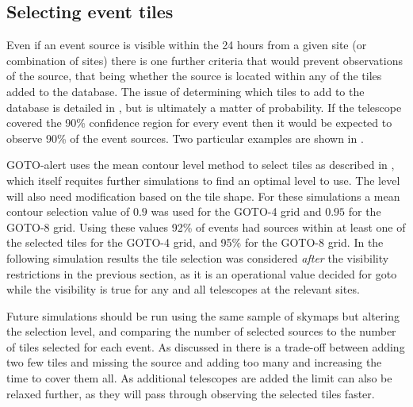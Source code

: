\begin{colsection}
\begin{colsection}
\clearpage

\end{colsection}


\subsection{Selecting event tiles}
\label{sec:gw_selecting}
\begin{colsection}


Even if an event source is visible within the 24 hours from a given site (or combination of sites) there is one further criteria that would prevent observations of the source, that being whether the source is located within any of the tiles added to the database. The issue of determining which tiles to add to the database is detailed in , but is ultimately a matter of probability. If the telescope covered the 90\% confidence region for every event then it would be expected to observe 90\% of the event sources. Two particular examples are shown in .

GOTO-alert uses the mean contour level method to select tiles as described in , which itself requites further simulations to find an optimal level to use. The level will also need modification based on the tile shape. For these simulations a mean contour selection value of $0.9$ was used for the GOTO-4 grid and $0.95$ for the GOTO-8 grid. Using these values 92\% of events had sources within at least one of the selected tiles for the GOTO-4 grid, and 95\% for the GOTO-8 grid. In the following simulation results the tile selection was considered \textit{after} the visibility restrictions in the previous section, as it is an operational value decided for \gls{goto} while the visibility is true for any and all telescopes at the relevant sites.

Future simulations should be run using the same sample of skymaps but altering the selection level, and comparing the number of selected sources to the number of tiles selected for each event. As discussed in  there is a trade-off between adding two few tiles and missing the source and adding too many and increasing the time to cover them all. As additional telescopes are added the limit can also be relaxed further, as they will pass through observing the selected tiles faster.


\end{colsection}
\end{colsection}
